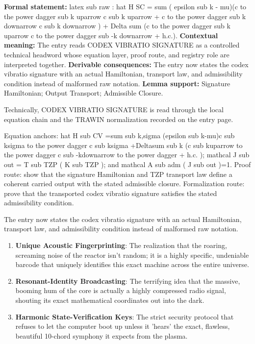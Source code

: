 \begingroup\footnotesize\setlength{\emergencystretch}{3em}\sloppy
\textbf{Formal statement:} latex sub raw : hat H SC = sum ( epsilon sub k - mu)(c to the power dagger sub k uparrow c sub k uparrow + c to the power dagger sub k downarrow c sub k downarrow ) + Delta sum (c to the power dagger sub k uparrow c to the power dagger sub -k downarrow + h.c.). \textbf{Contextual meaning:} The entry reads CODEX VIBRATIO SIGNATURE as a controlled technical headword whose equation layer, proof route, and registry role are interpreted together. \textbf{Derivable consequences:} The entry now states the codex vibratio signature with an actual Hamiltonian, transport law, and admissibility condition instead of malformed raw notation. \textbf{Lemma support:} Signature Hamiltonian; Output Transport; Admissible Closure.\par
\endgroup

Technically, CODEX VIBRATIO SIGNATURE is read through the local equation chain and the TRAWIN normalization recorded on the entry page.

Equation anchors: hat H sub CV =sum sub k,sigma (epsilon sub k-mu)c sub ksigma to the power dagger c sub ksigma +Deltasum sub k (c sub kuparrow to the power dagger c sub -kdownarrow to the power dagger + h.c. ); mathcal J sub out = T sub TZP ( K sub TZP ); and mathcal A sub adm ( J sub out )=1. Proof route: show that the signature Hamiltonian and TZP transport law define a coherent carried output with the stated admissible closure. Formalization route: prove that the transported codex vibratio signature satisfies the stated admissibility condition.

The entry now states the codex vibratio signature with an actual Hamiltonian, transport law, and admissibility condition instead of malformed raw notation.
\endgroup

\begin{enumerate}[leftmargin=1.6em,itemsep=6pt,topsep=4pt]
\item \textbf{Unique Acoustic Fingerprinting}: The realization that the roaring, screaming noise of the reactor isn't random; it is a highly specific, undeniable barcode that uniquely identifies this exact machine across the entire universe.
\item \textbf{Resonant-Identity Broadcasting}: The terrifying idea that the massive, booming hum of the core is actually a highly compressed radio signal, shouting its exact mathematical coordinates out into the dark.
\item \textbf{Harmonic State-Verification Keys}: The strict security protocol that refuses to let the computer boot up unless it 'hears' the exact, flawless, beautiful 10-chord symphony it expects from the plasma.
\end{enumerate}

